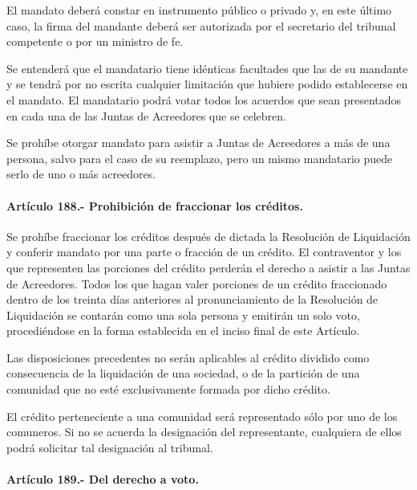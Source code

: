 \documentclass[
]{book}
\begin{document}
El mandato deberá constar en instrumento público o privado y, en este último caso, la firma del mandante deberá ser autorizada por el secretario del tribunal competente o por un ministro de fe.

Se entenderá que el mandatario tiene idénticas facultades que las de su mandante y se tendrá por no escrita cualquier limitación que hubiere podido establecerse en el mandato. El mandatario podrá votar todos los acuerdos que sean presentados en cada una de las Juntas de Acreedores que se celebren.

Se prohíbe otorgar mandato para asistir a Juntas de Acreedores a más de una persona, salvo para el caso de su reemplazo, pero un mismo mandatario puede serlo de uno o más acreedores.

\hypertarget{artuxedculo-188.--prohibiciuxf3n-de-fraccionar-los-cruxe9ditos.}{%
\paragraph*{Artículo 188.- Prohibición de fraccionar los créditos.}\label{artuxedculo-188.--prohibiciuxf3n-de-fraccionar-los-cruxe9ditos.}}

Se prohíbe fraccionar los créditos después de dictada la Resolución de Liquidación y conferir mandato por una parte o fracción de un crédito. El contraventor y los que representen las porciones del crédito perderán el derecho a asistir a las Juntas de Acreedores. Todos los que hagan valer porciones de un crédito fraccionado dentro de los treinta días anteriores al pronunciamiento de la Resolución de Liquidación se contarán como una sola persona y emitirán un solo voto, procediéndose en la forma establecida en el inciso final de este Artículo.

Las disposiciones precedentes no serán aplicables al crédito dividido como consecuencia de la liquidación de una sociedad, o de la partición de una comunidad que no esté exclusivamente formada por dicho crédito.

El crédito perteneciente a una comunidad será representado sólo por uno de los comuneros. Si no se acuerda la designación del representante, cualquiera de ellos podrá solicitar tal designación al tribunal.

\hypertarget{artuxedculo-189.--del-derecho-a-voto.}{%
\paragraph*{Artículo 189.- Del derecho a voto.}\label{artuxedculo-189.--del-derecho-a-voto.}}
\end{document}
